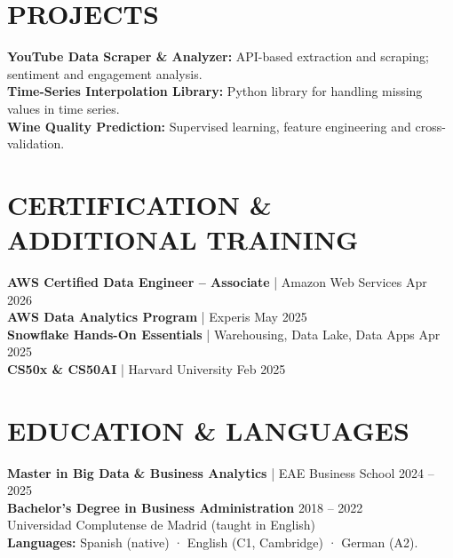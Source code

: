 \documentclass[a4paper,10pt]{article}
\begin{document}
\section{PROJECTS}
\textbf{YouTube Data Scraper \& Analyzer:} API-based extraction and scraping; sentiment and engagement analysis.\\
\textbf{Time-Series Interpolation Library:} Python library for handling missing values in time series.\\
\textbf{Wine Quality Prediction:} Supervised learning, feature engineering and cross-validation.

\section{CERTIFICATION \& ADDITIONAL TRAINING}
\textbf{AWS Certified Data Engineer -- Associate} | Amazon Web Services \hfill Apr 2026\\
\textbf{AWS Data Analytics Program} | Experis \hfill May 2025\\
\textbf{Snowflake Hands-On Essentials} | Warehousing, Data Lake, Data Apps \hfill Apr 2025\\
\textbf{CS50x \& CS50AI} | Harvard University \hfill Feb 2025

\section{EDUCATION \& LANGUAGES}
\textbf{Master in Big Data \& Business Analytics} | EAE Business School \hfill 2024 -- 2025\\
\textbf{Bachelor's Degree in Business Administration} \hfill 2018 -- 2022\\
Universidad Complutense de Madrid (taught in English)\\
\textbf{Languages:} Spanish (native) · English (C1, Cambridge) · German (A2).
\end{document}
